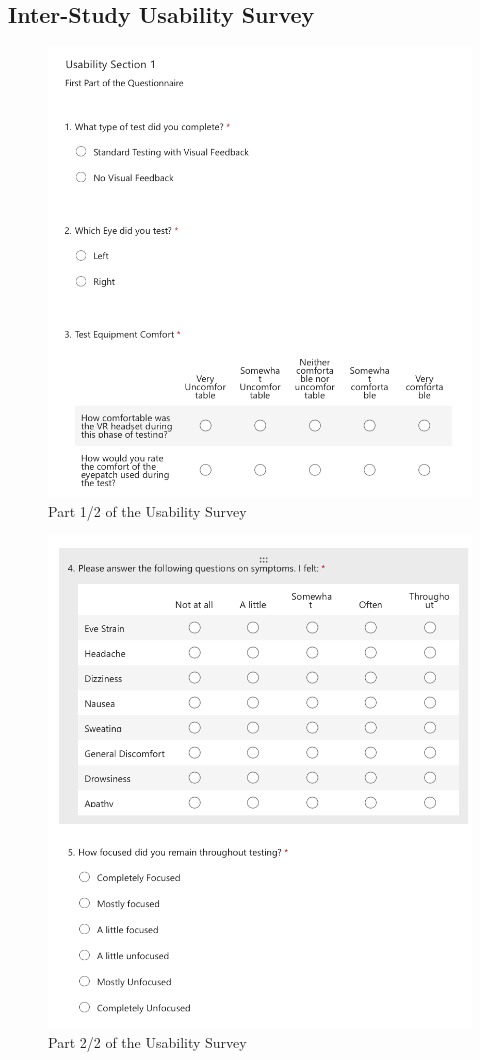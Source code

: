\documentclass{l4proj}
\begin{document}
\begin{appendices}
\subsection{Inter-Study Usability Survey} \label{appendix:US_part_1_1}
\begin{figure}[htbp]
    \centering
    \includegraphics[width=0.9\linewidth]{dissertation/images/US_Part1_1.png}   
    \caption{Part 1/2 of the Usability Survey}
\end{figure}
\begin{figure}[htbp]
    \centering
    \includegraphics[width=0.9\linewidth]{dissertation/images/US_Part1_2.png}   
    \caption{Part 2/2 of the Usability Survey}
\end{figure}
\newpage

\end{appendices}
\end{document}
